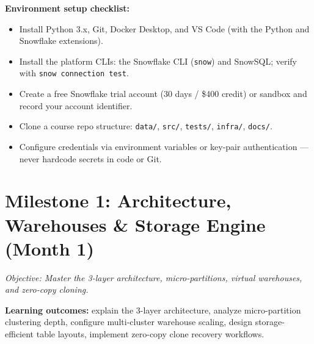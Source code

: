 \documentclass[11pt, a4paper]{article}
\begin{document}
\noindent\textbf{Environment setup checklist:}
\begin{itemize}[label=-]
    \item Install Python 3.x, Git, Docker Desktop, and VS Code (with the Python and Snowflake extensions).
    \item Install the platform CLIs: the Snowflake CLI (\texttt{snow}) and SnowSQL; verify with \texttt{snow connection test}.
    \item Create a free Snowflake trial account (30 days / \$400 credit) or sandbox and record your account identifier.
    \item Clone a course repo structure: \texttt{data/}, \texttt{src/}, \texttt{tests/}, \texttt{infra/}, \texttt{docs/}.
    \item Configure credentials via environment variables or key-pair authentication --- never hardcode secrets in code or Git.
\end{itemize}

\section{Milestone 1: Architecture, Warehouses \& Storage Engine (Month 1)}
\textit{Objective: Master the 3-layer architecture, micro-partitions, virtual warehouses, and zero-copy cloning.}
\par\noindent\textbf{Learning outcomes:} explain the 3-layer architecture, analyze micro-partition clustering depth, configure multi-cluster warehouse scaling, design storage-efficient table layouts, implement zero-copy clone recovery workflows.
\end{document}
